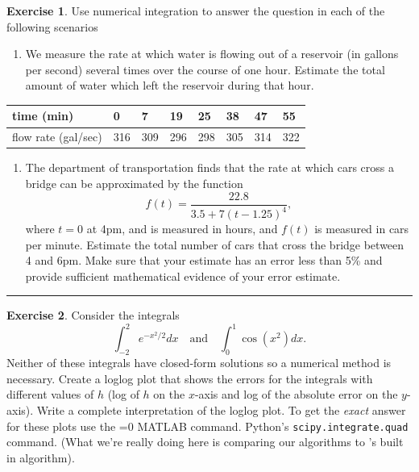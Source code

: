 \documentclass[
]{book}
\providecommand{\tightlist}{%
  \setlength{\itemsep}{0pt}\setlength{\parskip}{0pt}}
\theoremstyle{definition}
\theoremstyle{definition}
\theoremstyle{definition}
\newtheorem{exercise}{Exercise}[chapter]
\theoremstyle{remark}
\begin{document}
\begin{exercise}
\protect\hypertarget{exr:unnamed-chunk-263}{}{\label{exr:unnamed-chunk-263} }Use numerical integration to answer the question in each of the
following scenarios

\begin{enumerate}
\def\labelenumi{\alph{enumi}.}
\tightlist
\item
  We measure the rate at which water is flowing out of a reservoir (in
  gallons per second) several times over the course of one hour.
  Estimate the total amount of water which left the reservoir during
  that hour.
\end{enumerate}

\begin{longtable}[]{@{}llllllll@{}}
\toprule
time (min) & 0 & 7 & 19 & 25 & 38 & 47 & 55\tabularnewline
\midrule
\endhead
flow rate (gal/sec) & 316 & 309 & 296 & 298 & 305 & 314 & 322\tabularnewline
\bottomrule
\end{longtable}

\begin{enumerate}
\def\labelenumi{\alph{enumi}.}
\setcounter{enumi}{1}
\tightlist
\item
  The department of transportation finds that the rate at which cars
  cross a bridge can be approximated by the function
  \[f(t) = \frac{22.8 }{3.5 + 7(t-1.25)^4} ,\] where \(t=0\) at 4pm, and
  is measured in hours, and \(f(t)\) is measured in cars per minute.
  Estimate the total number of cars that cross the bridge between 4
  and 6pm. Make sure that your estimate has an error less than 5\% and
  provide sufficient mathematical evidence of your error estimate.
\end{enumerate}
\end{exercise}

\begin{center}\rule{0.5\linewidth}{0.5pt}\end{center}

\begin{exercise}
\protect\hypertarget{exr:unnamed-chunk-264}{}{\label{exr:unnamed-chunk-264} }Consider the integrals
\[\int_{-2}^2 e^{-x^2/2} dx \quad \text{and} \quad \int_0^1 \cos(x^2) dx.\]
Neither of these integrals have closed-form solutions so a numerical
method is necessary. Create a loglog plot that shows the errors for the
integrals with different values of \(h\) (log of \(h\) on the \(x\)-axis and
log of the absolute error on the \(y\)-axis). Write a complete
interpretation of the loglog plot. To get the \emph{exact} answer for these
plots use the =0 MATLAB command. Python's \texttt{scipy.integrate.quad}
command. (What we're really doing here is comparing our algorithms to 's
built in algorithm).
\end{exercise}
\end{document}
